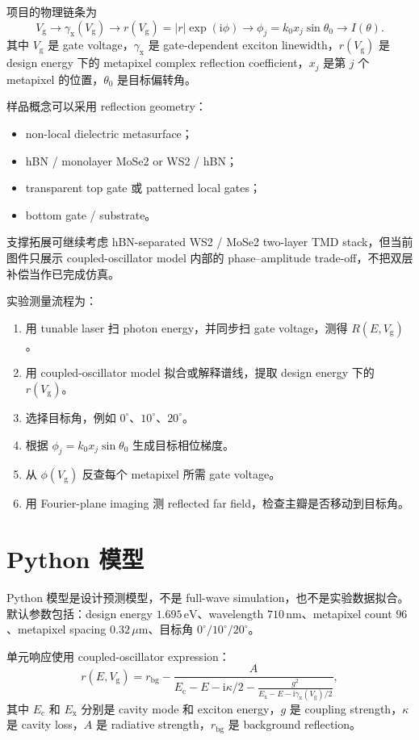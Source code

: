 \documentclass[UTF8,a4paper,12pt]{ctexart}
\newcommand{\vg}{V_{\mathrm{g}}}
\newcommand{\gammax}{\gamma_{\mathrm{x}}}
\newcommand{\imagunit}{\mathrm{i}}
\begin{document}
项目的物理链条为
\begin{equation}
  \vg \rightarrow \gammax(\vg) \rightarrow r(\vg)=|r|\exp(\imagunit\phi)
  \rightarrow \phi_j=k_0x_j\sin\theta_0 \rightarrow I(\theta).
\end{equation}
其中 $\vg$ 是 gate voltage，$\gammax$ 是 gate-dependent exciton linewidth，$r(\vg)$ 是 design energy 下的 metapixel complex reflection coefficient，$x_j$ 是第 $j$ 个 metapixel 的位置，$\theta_0$ 是目标偏转角。

样品概念可以采用 reflection geometry：
\begin{itemize}
  \item non-local dielectric metasurface；
  \item hBN / monolayer MoSe2 or WS2 / hBN；
  \item transparent top gate 或 patterned local gates；
  \item bottom gate / substrate。
\end{itemize}
支撑拓展可继续考虑 hBN-separated WS2 / MoSe2 two-layer TMD stack，但当前图件只展示 coupled-oscillator model 内部的 phase--amplitude trade-off，不把双层补偿当作已完成仿真。

实验测量流程为：
\begin{enumerate}
  \item 用 tunable laser 扫 photon energy，并同步扫 gate voltage，测得 $R(E,\vg)$。
  \item 用 coupled-oscillator model 拟合或解释谱线，提取 design energy 下的 $r(\vg)$。
  \item 选择目标角，例如 $0^\circ$、$10^\circ$、$20^\circ$。
  \item 根据 $\phi_j=k_0x_j\sin\theta_0$ 生成目标相位梯度。
  \item 从 $\phi(\vg)$ 反查每个 metapixel 所需 gate voltage。
  \item 用 Fourier-plane imaging 测 reflected far field，检查主瓣是否移动到目标角。
\end{enumerate}

\section{Python 模型}

Python 模型是设计预测模型，不是 full-wave simulation，也不是实验数据拟合。默认参数包括：design energy $1.695\,\mathrm{eV}$、wavelength $710\,\mathrm{nm}$、metapixel count $96$、metapixel spacing $0.32\,\mu\mathrm{m}$、目标角 $0^\circ/10^\circ/20^\circ$。

单元响应使用 coupled-oscillator expression：
\begin{equation}
  r(E,\vg)=r_{\mathrm{bg}}-\frac{A}
  {E_{\mathrm{c}}-E-\imagunit\kappa/2-\frac{g^2}{E_{\mathrm{x}}-E-\imagunit\gammax(\vg)/2}},
\end{equation}
其中 $E_{\mathrm{c}}$ 和 $E_{\mathrm{x}}$ 分别是 cavity mode 和 exciton energy，$g$ 是 coupling strength，$\kappa$ 是 cavity loss，$A$ 是 radiative strength，$r_{\mathrm{bg}}$ 是 background reflection。
\end{document}
